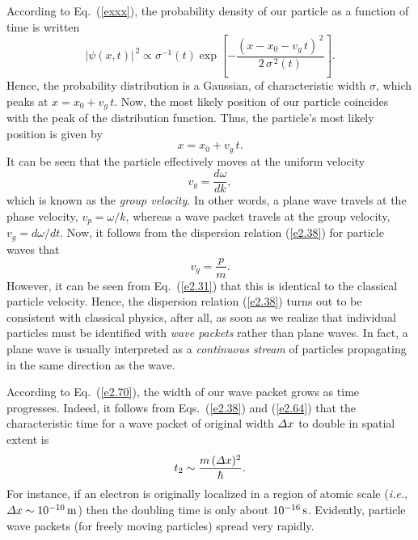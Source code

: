 According to Eq.~(\ref{exxx}), the probability density of our particle
as a function of time is written
\begin{equation}
|\psi(x,t)|^{\,2} \propto \sigma^{-1}(t)\exp\left[-\frac{(x-x_0-v_g\,t)^{\,2}}{2\,\sigma^{\,2}(t)}\right].
\end{equation}
Hence, the probability distribution is a Gaussian,  of
characteristic width $\sigma$, which peaks at $x=x_0+v_g\,t$. Now, the
most likely position of our particle  coincides with the peak of the
distribution function. Thus, the particle's most likely position is given by
\begin{equation}
x = x_0+v_g\,t.
\end{equation}
It can be seen that the particle effectively moves at the uniform velocity
\begin{equation}
v_g = \frac{d\omega}{dk},
\end{equation}
which is known as the {\em group velocity}. In other words, a plane wave
travels at the phase velocity, $v_p=\omega/k$, whereas a wave packet travels
at the group velocity, $v_g=d\omega/dt$. Now, it follows from the dispersion
relation (\ref{e2.38}) for particle waves that
\begin{equation}
v_g = \frac{p}{m}.
\end{equation}
However, it can be seen from Eq.~(\ref{e2.31}) that this is identical
to the classical particle velocity. Hence, the dispersion relation (\ref{e2.38}) turns out to be consistent with classical physics, after all, as soon as we realize that
individual particles must be identified with {\em wave packets}\/ rather than plane waves. In fact, a plane
wave is usually interpreted as a {\em continuous stream}\/ of particles propagating in the same direction as the wave. 

According to Eq.~(\ref{e2.70}),  the width of our wave packet
grows as time progresses. Indeed, it follows from Eqs.~(\ref{e2.38}) and (\ref{e2.64})
that the characteristic time for a wave packet of original width
${\mit\Delta} x$ to double in spatial extent is
\begin{equation}
t_2 \sim \frac{m\,({\mit\Delta}x)^2}{\hbar}.
\end{equation}
For instance, if an electron is originally localized in a region of atomic scale ({\em i.e.},
${\mit\Delta} x\sim 10^{-10}\,{\rm m}$) then the doubling time
is only about $10^{-16}\,{\rm s}$. Evidently, particle
wave packets (for freely moving particles) spread very rapidly. 

